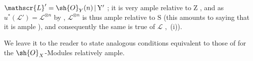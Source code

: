 \begin{corollary}[18.12.17]
$\mathscr{L}'=\sh{O}_Y(n)\,|\,\mathrm{Y}'$ ; it is very ample relative to $\mathrm{Z}$ , and as $u^*(\mathscr{L}')=\mathscr{L}^{\otimes n}$ by , $\mathscr{L}^{\otimes n}$ is thus ample relative to $\mathrm{S}$ (this amounts to saying that it is ample ), and consequently the same is true of $\mathscr{L}$ ,~(i)).

We leave it to the reader to state analogous conditions equivalent to those of  for the $\sh{O}_X$-Modules relatively ample.
\end{corollary}
